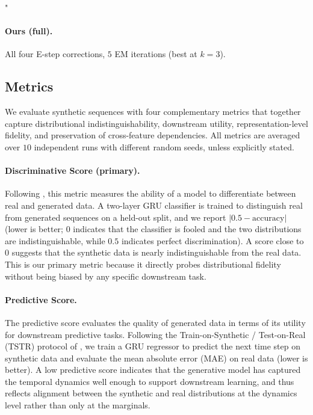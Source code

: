 "\documentclass{article}
\theoremstyle{plain}
\theoremstyle{definition}
\theoremstyle{remark}
\begin{document}
\paragraph{Ours (full).}
All four E-step corrections, $5$ EM iterations (best at $k = 3$).

\subsection{Metrics}
\label{app:metrics}

We evaluate synthetic sequences with four complementary metrics that together capture distributional indistinguishability, downstream utility, representation-level fidelity, and preservation of cross-feature dependencies. All metrics are averaged over $10$ independent runs with different random seeds, unless explicitly stated.

\paragraph{Discriminative Score (primary).}
Following \citet{yoon2019timegan}, this metric measures the ability of a model to differentiate between real and generated data. A two-layer GRU classifier is trained to distinguish real from generated sequences on a held-out split, and we report $|0.5 - \mathrm{accuracy}|$ (lower is better; $0$ indicates that the classifier is fooled and the two distributions are indistinguishable, while $0.5$ indicates perfect discrimination). A score close to $0$ suggests that the synthetic data is nearly indistinguishable from the real data. This is our primary metric because it directly probes distributional fidelity without being biased by any specific downstream task.

\paragraph{Predictive Score.}
The predictive score evaluates the quality of generated data in terms of its utility for downstream predictive tasks. Following the Train-on-Synthetic / Test-on-Real (TSTR) protocol of \citet{yoon2019timegan}, we train a GRU regressor to predict the next time step on synthetic data and evaluate the mean absolute error (MAE) on real data (lower is better). A low predictive score indicates that the generative model has captured the temporal dynamics well enough to support downstream learning, and thus reflects alignment between the synthetic and real distributions at the dynamics level rather than only at the marginals.
\end{document}

